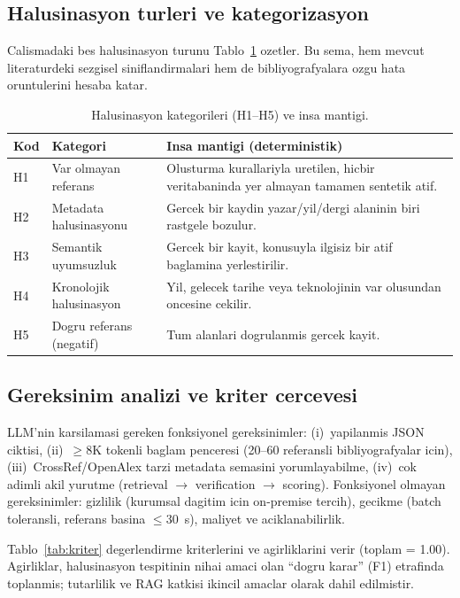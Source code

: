 \documentclass[11pt,a4paper]{article}
\begin{document}
\subsection{Halusinasyon turleri ve kategorizasyon}
\label{sub:cat}
Calismadaki bes halusinasyon turunu Tablo~\ref{tab:cat} ozetler. Bu sema, hem
mevcut literaturdeki sezgisel siniflandirmalari
\cite{walters2023fabrication,huang2023hallucination} hem de bibliyografyalara
ozgu hata oruntulerini hesaba katar.

\begin{table}[t]
\caption{Halusinasyon kategorileri (H1--H5) ve insa mantigi.}
\label{tab:cat}\small
\begin{tabularx}{\columnwidth}{l l X}
\toprule
\textbf{Kod} & \textbf{Kategori} & \textbf{Insa mantigi (deterministik)} \\
\midrule
H1 & Var olmayan referans & Olusturma kurallariyla uretilen, hicbir veritabaninda yer almayan tamamen sentetik atif. \\
H2 & Metadata halusinasyonu & Gercek bir kaydin yazar/yil/dergi alaninin biri rastgele bozulur. \\
H3 & Semantik uyumsuzluk & Gercek bir kayit, konusuyla ilgisiz bir atif baglamina yerlestirilir. \\
H4 & Kronolojik halusinasyon & Yil, gelecek tarihe veya teknolojinin var olusundan oncesine cekilir. \\
H5 & Dogru referans (negatif) & Tum alanlari dogrulanmis gercek kayit. \\
\bottomrule
\end{tabularx}
\end{table}

\subsection{Gereksinim analizi ve kriter cercevesi}
\label{sub:kriter}
LLM'nin karsilamasi gereken fonksiyonel gereksinimler: (i)~yapilanmis JSON
ciktisi, (ii)~$\geq$8K tokenli baglam penceresi (20--60 referansli
bibliyografyalar icin), (iii)~CrossRef/OpenAlex tarzi metadata semasini
yorumlayabilme, (iv)~cok adimli akil yurutme (retrieval $\to$ verification
$\to$ scoring). Fonksiyonel olmayan gereksinimler: gizlilik (kurumsal dagitim
icin on-premise tercih), gecikme (batch toleransli, referans basina $\leq$30~s),
maliyet ve aciklanabilirlik.

Tablo~\ref{tab:kriter} degerlendirme kriterlerini ve agirliklarini verir
(toplam = 1.00). Agirliklar, halusinasyon tespitinin nihai amaci olan
``dogru karar'' (F1) etrafinda toplanmis; tutarlilik ve RAG katkisi
ikincil amaclar olarak dahil edilmistir.
\end{document}
